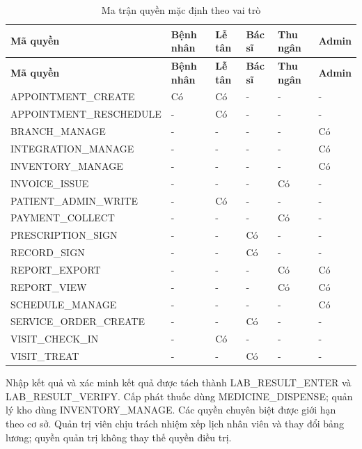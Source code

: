 {\small\setlength{\tabcolsep}{3pt}\renewcommand{\arraystretch}{1.12}
\begin{longtable}{@{}L{\textwidth-13.5pt\relax} L{\textwidth-3.3pt\relax} L{\textwidth-3.3pt\relax} L{\textwidth-3.3pt\relax} L{\textwidth-3.3pt\relax} L{\textwidth-3.3pt\relax}@{}}
\caption{Ma trận quyền mặc định theo vai trò}\\
\toprule
\textbf{Mã quyền} & \textbf{Bệnh nhân} & \textbf{Lễ tân} & \textbf{Bác sĩ} & \textbf{Thu ngân} & \textbf{Admin}\\\midrule
\endfirsthead
\toprule
\textbf{Mã quyền} & \textbf{Bệnh nhân} & \textbf{Lễ tân} & \textbf{Bác sĩ} & \textbf{Thu ngân} & \textbf{Admin}\\\midrule
\endhead
\bottomrule\endlastfoot
APPOINTMENT\_\allowbreak{}CREATE & Có & Có & - & - & -\\[3pt]
APPOINTMENT\_\allowbreak{}RESCHEDULE & - & Có & - & - & -\\[3pt]
BRANCH\_\allowbreak{}MANAGE & - & - & - & - & Có\\[3pt]
INTEGRATION\_\allowbreak{}MANAGE & - & - & - & - & Có\\[3pt]
INVENTORY\_\allowbreak{}MANAGE & - & - & - & - & Có\\[3pt]
INVOICE\_\allowbreak{}ISSUE & - & - & - & Có & -\\[3pt]
PATIENT\_\allowbreak{}ADMIN\_\allowbreak{}WRITE & - & Có & - & - & -\\[3pt]
PAYMENT\_\allowbreak{}COLLECT & - & - & - & Có & -\\[3pt]
PRESCRIPTION\_\allowbreak{}SIGN & - & - & Có & - & -\\[3pt]
RECORD\_\allowbreak{}SIGN & - & - & Có & - & -\\[3pt]
REPORT\_\allowbreak{}EXPORT & - & - & - & Có & Có\\[3pt]
REPORT\_\allowbreak{}VIEW & - & - & - & Có & Có\\[3pt]
SCHEDULE\_\allowbreak{}MANAGE & - & - & - & - & Có\\[3pt]
SERVICE\_\allowbreak{}ORDER\_\allowbreak{}CREATE & - & - & Có & - & -\\[3pt]
VISIT\_\allowbreak{}CHECK\_\allowbreak{}IN & - & Có & - & - & -\\[3pt]
VISIT\_\allowbreak{}TREAT & - & - & Có & - & -\\[3pt]
\end{longtable}}
Nhập kết quả và xác minh kết quả được tách thành LAB\_\allowbreak{}RESULT\_\allowbreak{}ENTER và LAB\_\allowbreak{}RESULT\_\allowbreak{}VERIFY.\allowbreak{} Cấp phát thuốc dùng MEDICINE\_\allowbreak{}DISPENSE; quản lý kho dùng INVENTORY\_\allowbreak{}MANAGE.\allowbreak{} Các quyền chuyên biệt được giới hạn theo cơ sở.\allowbreak{} Quản trị viên chịu trách nhiệm xếp lịch nhân viên và thay đổi bảng lương; quyền quản trị không thay thế quyền điều trị.\allowbreak{}


